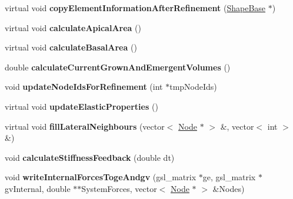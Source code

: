 \begin{DoxyCompactItemize}
\item 
\hypertarget{classShapeBase_a8e96ca0cb1147c06913b5808843d3564}{}virtual void {\bfseries copy\+Element\+Information\+After\+Refinement} (\hyperlink{classShapeBase}{Shape\+Base} $\ast$)\label{classShapeBase_a8e96ca0cb1147c06913b5808843d3564}

\item 
\hypertarget{classShapeBase_a010092ac7af5667facbbb8fb6bd98976}{}virtual void {\bfseries calculate\+Apical\+Area} ()\label{classShapeBase_a010092ac7af5667facbbb8fb6bd98976}

\item 
\hypertarget{classShapeBase_a0bc80947335afbc181fca326e9a6b7fb}{}virtual void {\bfseries calculate\+Basal\+Area} ()\label{classShapeBase_a0bc80947335afbc181fca326e9a6b7fb}

\item 
\hypertarget{classShapeBase_a58ffd31ed76797d558b085fe754cc4b3}{}double {\bfseries calculate\+Current\+Grown\+And\+Emergent\+Volumes} ()\label{classShapeBase_a58ffd31ed76797d558b085fe754cc4b3}

\item 
\hypertarget{classShapeBase_a33c03670e18ca00ca2aa9ad1bfe0ffe5}{}void {\bfseries update\+Node\+Ids\+For\+Refinement} (int $\ast$tmp\+Node\+Ids)\label{classShapeBase_a33c03670e18ca00ca2aa9ad1bfe0ffe5}

\item 
\hypertarget{classShapeBase_a018cc92b513ff64b919c374b0767cc1b}{}virtual void {\bfseries update\+Elastic\+Properties} ()\label{classShapeBase_a018cc92b513ff64b919c374b0767cc1b}

\item 
\hypertarget{classShapeBase_ac10a19fafa895695e0d2544050690c29}{}virtual void {\bfseries fill\+Lateral\+Neighbours} (vector$<$ \hyperlink{classNode}{Node} $\ast$ $>$ \&, vector$<$ int $>$ \&)\label{classShapeBase_ac10a19fafa895695e0d2544050690c29}

\item 
\hypertarget{classShapeBase_ad6bae633124d81b12f470951e59b7ddc}{}void {\bfseries calculate\+Stiffness\+Feedback} (double dt)\label{classShapeBase_ad6bae633124d81b12f470951e59b7ddc}

\item 
\hypertarget{classShapeBase_a0f3186b2f1bfd0c1f012f4cede1074d6}{}void {\bfseries write\+Internal\+Forces\+Toge\+Andgv} (gsl\+\_\+matrix $\ast$ge, gsl\+\_\+matrix $\ast$gv\+Internal, double $\ast$$\ast$System\+Forces, vector$<$ \hyperlink{classNode}{Node} $\ast$ $>$ \&Nodes)\label{classShapeBase_a0f3186b2f1bfd0c1f012f4cede1074d6}


\end{DoxyCompactItemize}
